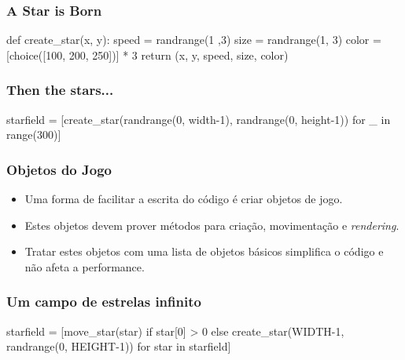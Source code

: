 \begin{frame}[fragile]
    \frametitle{A Star is Born}

    \begin{python}
        def create_star(x, y):
            speed = randrange(1 ,3)
            size = randrange(1, 3)
            color = [choice([100, 200, 250])] * 3
            return (x, y, speed, size, color)
    \end{python}
\end{frame}

\begin{frame}[fragile]
    \frametitle{Then the stars...}

    \begin{python}
        starfield = [create_star(randrange(0, width-1),
                                 randrange(0, height-1))
                     for _ in range(300)]
    \end{python}
\end{frame}

\begin{frame}
    \frametitle{Objetos do Jogo}

    \begin{itemize}
        \item Uma forma de facilitar a escrita do código é criar objetos de jogo.
        \item Estes objetos devem prover métodos para criação, movimentação e
        \textit{rendering}.
        \item Tratar estes objetos com uma lista de objetos básicos simplifica
        o código e não afeta a performance.
    \end{itemize}
\end{frame}

\begin{frame}[fragile]
    \frametitle{Um campo de estrelas infinito}

    \begin{python}
        starfield = [move_star(star)
                     if star[0] > 0
                     else create_star(WIDTH-1,
                                      randrange(0, HEIGHT-1))
                     for star in starfield]
        \end{python}
\end{frame}

